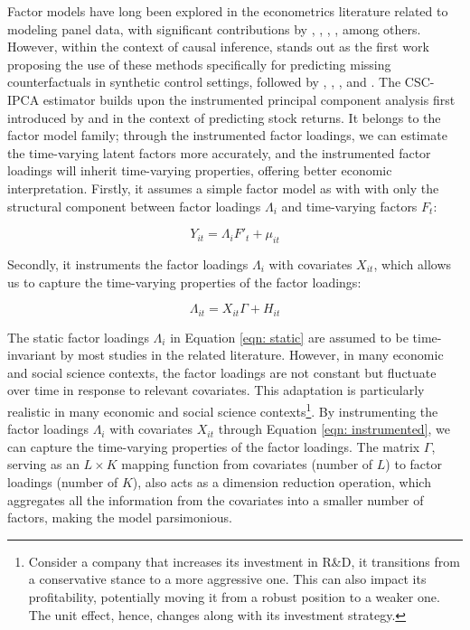 \documentclass[12pt]{article}
\begin{document}
Factor models have long been explored in the econometrics literature related to modeling panel data, with significant contributions by \cite{bai2003computation}, \cite{pesaran2006estimation}, \cite{stock2002forecasting}, \cite{eberhardt2009cross}, among others. However, within the context of causal inference, \cite{hsiao2012panel} stands out as the first work proposing the use of these methods specifically for predicting missing counterfactuals in synthetic control settings, followed by \cite{gobillon2016regional}, \cite{xu2017generalized}, \cite{chan2016policy}, and \cite{li2018inference}. The CSC-IPCA estimator builds upon the instrumented principal component analysis first introduced by \cite{kelly2020instrumented} and \cite{kelly2019characteristics} in the context of predicting stock returns. It belongs to the factor model family; through the instrumented factor loadings, we can estimate the time-varying latent factors more accurately, and the instrumented factor loadings will inherit time-varying properties, offering better economic interpretation. Firstly, it assumes a simple factor model as with \cite{bai2003computation} with only the structural component between factor loadings $\Lambda_i$ and time-varying factors $F_t$:

\begin{equation}
\label{eqn: static}
    Y_{it} = \Lambda_i F'_t + \mu_{it}
\end{equation}

\noindent Secondly, it instruments the factor loadings $\Lambda_i$ with covariates $X_{it}$, which allows us to capture the time-varying properties of the factor loadings:

\begin{equation}
\label{eqn: instrumented}
    \Lambda_{it} = X_{it}\Gamma + H_{it}
\end{equation}

The static factor loadings $\Lambda_i$ in Equation \ref{eqn: static} are assumed to be time-invariant by most studies in the related literature. However, in many economic and social science contexts, the factor loadings are not constant but fluctuate over time in response to relevant covariates. This adaptation is particularly realistic in many economic and social science contexts\footnote{Consider a company that increases its investment in R\&D, it transitions from a conservative stance to a more aggressive one. This can also impact its profitability, potentially moving it from a robust position to a weaker one. The unit effect, hence, changes along with its investment strategy.}. By instrumenting the factor loadings $\Lambda_i$ with covariates $X_{it}$ through Equation \ref{eqn: instrumented}, we can capture the time-varying properties of the factor loadings. The matrix $\Gamma$, serving as an $L \times K$ mapping function from covariates (number of $L$) to factor loadings (number of $K$), also acts as a dimension reduction operation, which aggregates all the information from the covariates into a smaller number of factors, making the model parsimonious.
\end{document}
